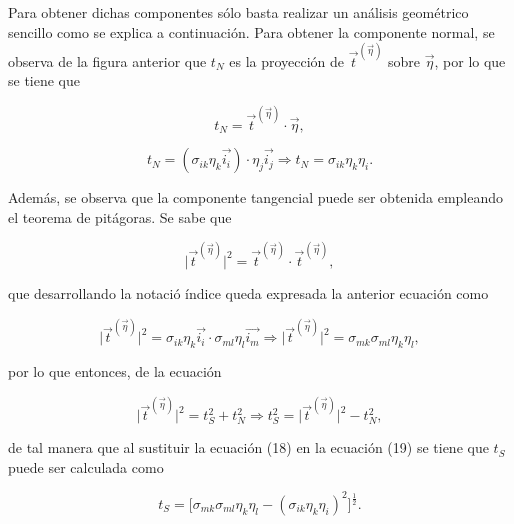 \documentclass{article}
\begin{document}

    Para obtener dichas componentes s\'{o}lo basta
    realizar un an\'{a}lisis geom\'{e}trico sencillo como se explica a continuaci\'{o}n.
    Para obtener la componente normal, se observa de la figura anterior que $t_{N}$ es la
    proyecci\'{o}n de $\vec{t}^{(\vec{\eta})}$ sobre $\vec{\eta}$, por lo que se tiene que

    \begin{equation}
        t_{N} = \vec{t}^{(\vec{\eta})} \cdot \vec{\eta},
    \end{equation}

    \begin{equation}
        t_{N} = (\sigma_{ik}\eta_{k}\vec{i_{i}})\cdot\eta_{j}\vec{i_{j}}
        \Longrightarrow
        t_{N} = \sigma_{ik}\eta_{k}\eta_{i}.
    \end{equation}

    Adem\'{a}s, se observa que la componente tangencial puede ser obtenida empleando el
    teorema de pit\'{a}goras. Se sabe que

    \begin{equation}
        \lvert \vec{t}^{(\vec{\eta})} \rvert^2 = \vec{t}^{(\vec{\eta})} \cdot \vec{t}^{(\vec{\eta})},
    \end{equation}
    
    que desarrollando la notaci\'{o} \'{i}ndice queda expresada la anterior ecuaci\'{o}n como

    \begin{equation}
        \lvert \vec{t}^{(\vec{\eta})} \rvert^2 = \sigma_{ik}\eta_{k}\vec{i_{i}} \cdot
        \sigma_{ml}\eta_{l}\vec{i_{m}} \Rightarrow
        \lvert \vec{t}^{(\vec{\eta})} \rvert^2 = \sigma_{mk}\sigma_{ml}\eta_{k}\eta_{l},
    \end{equation}

    por lo que entonces, de la ecuaci\'{o}n

    \begin{equation}
        \lvert \vec{t}^{(\vec{\eta})} \rvert^2 = t_{S}^2 + t_{N}^2
        \Rightarrow
        t_{S}^2 = \lvert \vec{t}^{(\vec{\eta})} \rvert^2 - t_{N}^2,
    \end{equation}

    de tal manera que al sustituir la ecuaci\'{o}n (18) en la ecuaci\'{o}n (19) se tiene que 
    $t_{S}$ puede ser calculada como

    \begin{equation}
        t_{S} = \lbrack
            \sigma_{mk}\sigma_{ml}\eta_{k}\eta_{l} 
            - (\sigma_{ik}\eta_{k}\eta_{i})^2 
        \rbrack^\frac{1}{2}.
    \end{equation}
\end{document}
